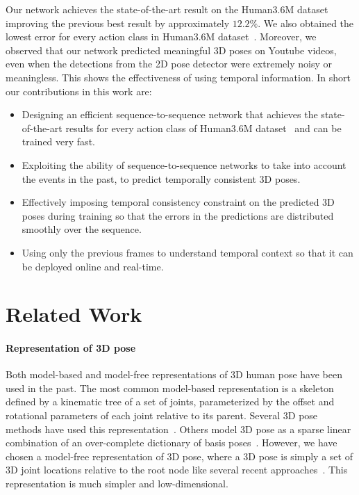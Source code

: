 \documentclass[runningheads]{llncs}
\begin{document}
Our network achieves the state-of-the-art result on the Human3.6M dataset improving the previous best result by approximately $12.2\%$. We also obtained the lowest error for every action class in Human3.6M dataset~\cite{h36m_pami}. Moreover, we observed that our network predicted meaningful 3D poses on Youtube videos, even when the detections from the 2D pose detector were extremely noisy or meaningless. This shows the effectiveness of using temporal information. In short our contributions in this work are:
\begin{itemize}
\item Designing an efficient sequence-to-sequence network that achieves the state-of-the-art results for every action class of Human3.6M dataset~\cite{h36m_pami} and can be trained very fast.
\item Exploiting the ability of sequence-to-sequence networks to take into account the  events in the past, to predict temporally consistent 3D poses. 
\item Effectively imposing temporal consistency constraint on the predicted 3D poses during training so that the errors in the predictions are distributed smoothly over the sequence. 
\item Using only the previous frames to understand temporal context so that it can be deployed online and real-time.
\end{itemize}



\section{Related Work}
\paragraph{Representation of 3D pose}
Both model-based and model-free representations of 3D human pose have been used in the past. The most common model-based representation is a skeleton defined by a kinematic tree of a set of joints, parameterized by the offset and rotational parameters of each joint relative to its parent. Several 3D pose methods have used this representation~\cite{barron_2001,ParameswaranC04,bogo2016keep,zhou2016deep}. Others model 3D pose as a sparse linear combination of an over-complete dictionary of basis poses~\cite{akhter2015pose,zhou2016sparseness,ramakrishna2012reconstructing}. However, we have chosen a model-free representation of 3D pose, where a 3D pose is simply a set of 3D joint locations relative to the root node like several recent approaches~\cite{JMartinez:ICCV:2017,distance-matrix,li20143d,mehta2016monocular}. This representation is much simpler and low-dimensional.
\end{document}
